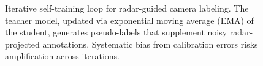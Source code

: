 \begin{figure}[t]
  \caption{Iterative self-training loop for radar-guided camera labeling. The teacher model, updated via exponential moving average (EMA) of the student, generates pseudo-labels that supplement noisy radar-projected annotations. Systematic bias from calibration errors risks amplification across iterations.}
  \label{fig:self_training_loop}
\end{figure}

